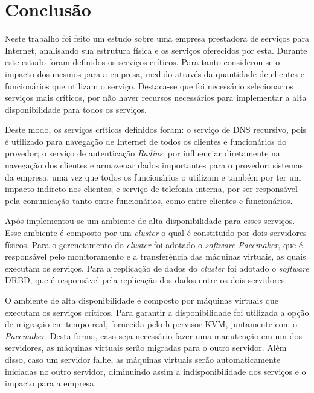 \chapter{Conclusão}
\label{cap:conclusao}

Neste trabalho foi feito um estudo sobre uma empresa prestadora de serviços para Internet, analisando sua estrutura física e os serviços oferecidos 
por esta. Durante este estudo foram definidos os serviços críticos. Para tanto considerou-se o impacto dos mesmos para a empresa, medido através
da quantidade de clientes e funcionários que utilizam o serviço. Destaca-se que foi necessário selecionar os serviços mais críticos, por não 
haver recursos necessários para implementar a alta disponibilidade para todos os serviços.

Deste modo, os serviços críticos definidos foram: o serviço de \ac{DNS} recursivo, pois é utilizado para navegação de Internet de todos os clientes 
e funcionários do provedor; o serviço de autenticação \textit{Radius}, por influenciar diretamente na navegação dos clientes e armazenar dados 
importantes para o provedor; sistemas da empresa, uma vez que todos os funcionários o utilizam e também por ter um impacto indireto nos 
clientes; e serviço de telefonia interna, por ser responsável pela comunicação tanto entre funcionários, como entre clientes e funcionários.

Após implementou-se um ambiente de alta disponibilidade para esses serviços. Esse ambiente é composto por um \textit{cluster} o qual é constituído 
por dois servidores físicos. Para o gerenciamento do \textit{cluster} foi adotado o \textit{software} \textit{Pacemaker}, que é responsável pelo 
monitoramento e a transferência das máquinas virtuais, as quais executam os serviços. Para a replicação de dados 
do \textit{cluster} foi adotado o \textit{software} \ac{DRBD}, que é responsável pela replicação dos dados entre os dois servidores.

O ambiente de alta disponibilidade é composto por máquinas virtuais que executam os serviços críticos. Para garantir a disponibilidade 
foi utilizada a opção de migração em tempo real, fornecida pelo hipervisor \ac{KVM}, juntamente com o \textit{Pacemaker}. Desta forma, 
caso seja necessário fazer uma manutenção em um dos servidores, as máquinas virtuais serão migradas para o outro servidor.
Além disso, caso um servidor falhe, as máquinas virtuais serão automaticamente iniciadas no outro servidor, diminuindo assim a indisponibilidade
dos serviços e o impacto para a empresa.

